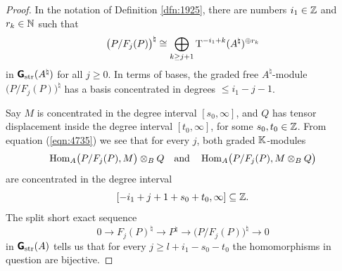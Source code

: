 \begin{proof}
In the notation of Definition \ref{dfn:1925}, there are numbers $i_1 \in \mathbb{Z}$ 
and $r_k \in \mathbb{N}$ such that
\begin{equation} \label{eqn:4735}
\bigl( P / F_j(P) \bigr)^{\natural} \cong 
\bigoplus_{k \geq j + 1} \operatorname{T}^{-i_1 + k}(A^{\natural})^{\oplus r_k}
\end{equation}
in $\boldsymbol{\mathsf{G}}_{\mathrm{str}}(A^{\natural})$ for all $j \geq 0$. 
In terms of bases, the graded free $A^{\natural}$-module 
$\bigl( P / F_j(P) \bigr)^{\natural}$
has a basis concentrated in degrees $\leq i_1 - j - 1$.

Say $M$ is concentrated in the degree interval $[s_0, \infty]$,
and $Q$ has tensor displacement inside the degree interval $[t_0, \infty]$,
for some $s_0, t_0 \in \mathbb{Z}$. From equation (\ref{eqn:4735}) we see that for 
every $j$, both graded $\mathbb{K}$-modules
\[  \operatorname{Hom}_{A} \bigl(  P / F_j(P), M  \bigr) \otimes_{B} Q 
\quad \textup{and} \quad 
\operatorname{Hom}_{A} \bigl(  P / F_j(P), M  \otimes_{B} Q \bigr) \]
are concentrated in the degree interval 
\[ [-i_1 + j + 1  + s_0 + t_0, \infty] \subseteq \mathbb{Z} . \]
The split short  exact sequence 
\[ 0 \to F_j(P)^{\natural} \to P^{\natural} \to 
\bigl( P / F_j(P) \bigr)^{\natural} \to 0 \]
in $\boldsymbol{\mathsf{G}}_{\mathrm{str}}(A)$ tells us that for every 
$j \geq l + i_1 - s_0 - t_0$
the homomorphisms in question are bijective. 
\end{proof}

